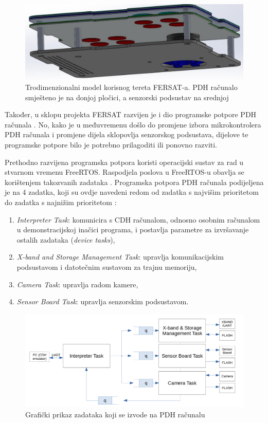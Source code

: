\begin{figure}[htb]
    \centering
    \includegraphics[width=\textwidth]{slike/fersat_3d.png}
    \caption{Trodimenzionalni model korisnog tereta FERSAT-a. PDH računalo smješteno je na donjoj pločici, a senzorski podsustav na srednjoj \cite{zavrsni_filip_juric}}
    \label{fig:fersat_3d}
\end{figure}

Također, u sklopu projekta FERSAT razvijen je i dio programske potpore PDH računala \cite{diplomski_goran_petrak}. No, kako je u međuvremenu došlo do promjene izbora mikrokontrolera PDH računala i promjene dijela sklopovlja senzorskog podsustava, dijelove te programske potpore bilo je potrebno prilagoditi ili ponovno razviti.

Prethodno razvijena programska potpora koristi operacijski sustav za rad u stvarnom vremenu FreeRTOS. Raspodjela poslova u FreeRTOS-u obavlja se korištenjem takozvanih zadataka . Programska potpora PDH računala podijeljena je na 4 zadatka, koji su ovdje navedeni redom od zadatka s najvišim prioritetom do zadatka s najnižim prioritetom \cite{diplomski_goran_petrak}:

\begin{enumerate}
    \item \textit{Interpreter Task}: komunicira s CDH računalom, odnosno osobnim računalom u demonstracijskoj inačici programa, i postavlja parametre za izvršavanje ostalih zadataka (\textit{device tasks}),
    \item \textit{X-band and Storage Management Task}: upravlja komunikacijskim podsustavom i datotečnim sustavom za trajnu memoriju,
    \item \textit{Camera Task}: upravlja radom kamere,
    \item \textit{Sensor Board Task}: upravlja senzorskim podsustavom.
\end{enumerate}

\begin{figure}[htb]
    \centering
    \includegraphics[width=\textwidth]{slike/rtos_zadaci.png}
    \caption{Grafički prikaz zadataka koji se izvode na PDH računalu \cite{diplomski_goran_petrak}}
    \label{fig:rtos_zadaci}
\end{figure}

